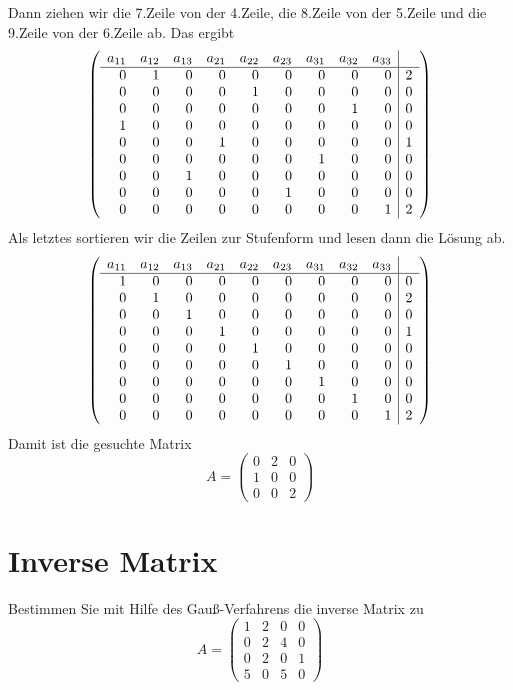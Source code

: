 Dann ziehen wir die 7.Zeile von der 4.Zeile, die 8.Zeile von der 5.Zeile und die 9.Zeile von der 6.Zeile ab. Das ergibt
$$
	\left(
		\begin{array}{rrrrrrrrr | r}
			a_{11} & a_{12} & a_{13}&a_{21}&a_{22}&a_{23}&a_{31}&a_{32}&a_{33}&\\
			\hline
			0&1&0&0&0&0&0&0&0&2\\
			0&0&0&0&1&0&0&0&0&0\\
			0&0&0&0&0&0&0&1&0&0\\
			1&0&0&0&0&0&0&0&0&0\\
			0&0&0&1&0&0&0&0&0&1\\
			0&0&0&0&0&0&1&0&0&0\\
			0&0&1&0&0&0&0&0&0&0\\
			0&0&0&0&0&1&0&0&0&0\\
			0&0&0&0&0&0&0&0&1&2\\
		\end{array}
	\right)
$$
Als letztes sortieren wir die Zeilen zur Stufenform und lesen dann die Lösung ab.
$$
	\left(
		\begin{array}{rrrrrrrrr | r}
			a_{11} & a_{12} & a_{13}&a_{21}&a_{22}&a_{23}&a_{31}&a_{32}&a_{33}&\\
			\hline
			1&0&0&0&0&0&0&0&0&0\\
			0&1&0&0&0&0&0&0&0&2\\
			0&0&1&0&0&0&0&0&0&0\\
			0&0&0&1&0&0&0&0&0&1\\
			0&0&0&0&1&0&0&0&0&0\\
			0&0&0&0&0&1&0&0&0&0\\
			0&0&0&0&0&0&1&0&0&0\\
			0&0&0&0&0&0&0&1&0&0\\
			0&0&0&0&0&0&0&0&1&2\\
		\end{array}
	\right)
$$
Damit ist die gesuchte Matrix
$$
A= \begin{pmatrix}0&2&0\\1&0&0\\0&0&2 \end{pmatrix}
$$

\section{Inverse Matrix}
Bestimmen Sie mit Hilfe des Gauß-Verfahrens die inverse Matrix zu
$$
A= \begin{pmatrix}1&2 & 0&0 \\ 0 & 2 & 4 & 0 \\ 0& 2 & 0 & 1 \\ 5 & 0& 5 & 0  \end{pmatrix}
$$
